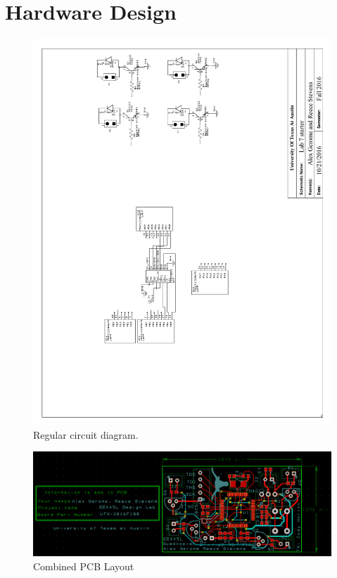 \documentclass{article}
\begin{document}
\section{Hardware Design}
\begin{figure}[H]
	\includegraphics[width=\textwidth]{./CircuitSchematic}
    \caption{Regular circuit diagram.}
\end{figure}

\begin{figure}[H]
	\includegraphics[width=\textwidth]{./PCB_both}
    \caption{Combined PCB Layout}
\end{figure}
\end{document}
